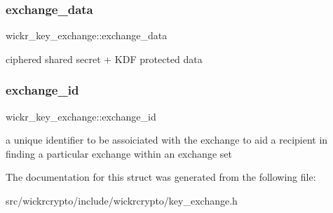 \subsubsection{\texorpdfstring{exchange\+\_\+data}{exchange\_data}}
{\footnotesize\ttfamily wickr\+\_\+key\+\_\+exchange\+::exchange\+\_\+data}

ciphered shared secret + K\+DF protected data \mbox{\label{structwickr__key__exchange_a744e71ef6676c78643646adf1693a4e5}} 
\subsubsection{\texorpdfstring{exchange\+\_\+id}{exchange\_id}}
{\footnotesize\ttfamily wickr\+\_\+key\+\_\+exchange\+::exchange\+\_\+id}

a unique identifier to be assoiciated with the exchange to aid a recipient in finding a particular exchange within an exchange set 

The documentation for this struct was generated from the following file\+:\begin{DoxyCompactItemize}
\item 
src/wickrcrypto/include/wickrcrypto/key\+\_\+exchange.\+h\end{DoxyCompactItemize}
